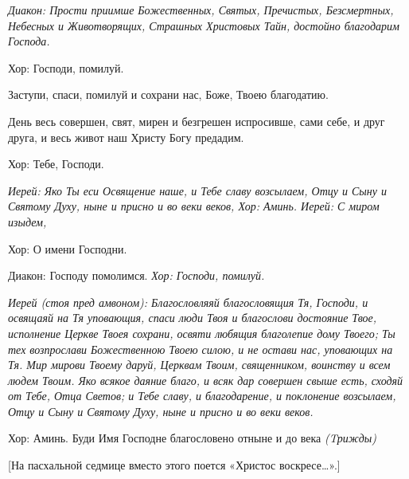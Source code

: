 

\itshape  Диакон:\normalfont{} Прости приимше Божественных, Святых, Пречистых, Безсмертных, Небесных и Животворящих, Страшных Христовых Тайн, достойно благодарим Господа. \itshape 


  Хор:\normalfont{} Господи, помилуй. 


  Заступи, спаси, помилуй и сохрани нас, Боже, Твоею благодатию. 


  День весь совершен, свят, мирен и безгрешен испросивше, сами себе, и друг друга, и весь живот наш Христу Богу предадим. \itshape 


  Хор:\normalfont{} Тебе, Господи. 


\itshape Иерей:\normalfont{} Яко Ты еси Освящение наше, и Тебе славу возсылаем, Отцу и Сыну и Святому Духу, ныне и присно и во веки веков, \itshape  Хор:\normalfont{} Аминь. \itshape  Иерей: С\normalfont{} миром изыдем, \itshape 


  Хор:\normalfont{} О имени Господни. \itshape 


  Диакон:\normalfont{} Господу помолимся. \itshape  Хор:\normalfont{} Господи, помилуй. 




\itshape   Иерей (стоя пред амвоном):\normalfont{} Благословляяй благословящия Тя, Господи, и освящаяй на Тя уповающия, спаси люди Твоя и благослови достояние Твое, исполнение Церкве Твоея сохрани, освяти любящия благолепие дому Твоего; Ты тех возпрослави Божественною Твоею силою, и не остави нас, уповающих на Тя. Мир мирови Твоему даруй, Церквам Твоим, священником, воинству и всем людем Твоим. Яко всякое даяние благо, и всяк дар совершен свыше есть, сходяй от Тебе, Отца Светов; и Тебе славу, и благодарение, и поклонение возсылаем, Отцу и Сыну и Святому Духу, ныне и присно и во веки веков. \itshape 


  Хор:\normalfont{} Аминь. Буди Имя Господне благословено отныне и до века \itshape (Tрижд\normalfont{}ы)


  [На пасхальной седмице вместо этого поется «Христос воскресе…».]





